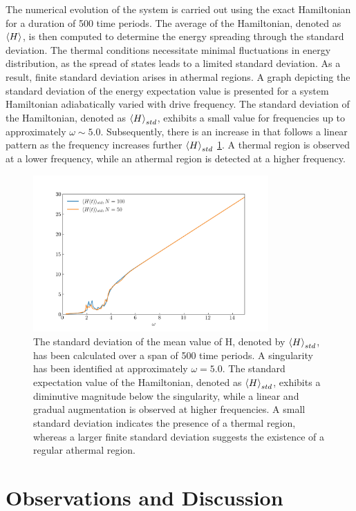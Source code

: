 \documentclass[%
reprint,
superscriptaddress,
amsmath,amssymb,
aps,
prb,
]{revtex4-2}
\begin{document}
	The numerical evolution of the system is carried out using the exact Hamiltonian for a duration of 500 time periods. The average of the Hamiltonian, denoted as $\expval{H}$, is then computed to determine the energy spreading through the standard deviation. The thermal conditions necessitate minimal fluctuations in energy distribution, as the spread of states leads to a limited standard deviation\cite{reimann_symmetry-prohibited_2021}. As a result, finite standard deviation arises in athermal regions. A graph depicting the standard deviation of the energy expectation value is presented for a system Hamiltonian adiabatically varied with drive frequency. The standard deviation of the Hamiltonian, denoted as $\expval{H}_{std}$, exhibits a small value for frequencies up to approximately $\omega \sim 5.0$. Subsequently, there is an increase in  that follows a linear pattern as the frequency increases further $\expval{H}_{std}$ \ref{fig:havg_std}. A thermal region is observed at a lower frequency, while an athermal region is detected at a higher frequency.
	
	\begin{figure}[!ht]
		\centering
		\includegraphics[width = 9.0cm]{hbar_std.jpg}
		\caption{The standard deviation of the mean value of H, denoted by $\expval{H}_{std}$, has been calculated over a span of 500 time periods. A singularity has been identified at approximately $\omega = 5.0$. The standard expectation value of the Hamiltonian, denoted as $\expval{H}_{std}$, exhibits a diminutive magnitude below the singularity, while a linear and gradual augmentation is observed at higher frequencies. A small standard deviation indicates the presence of a thermal region, whereas a larger finite standard deviation suggests the existence of a regular athermal region.}
		\label{fig:havg_std}
	\end{figure}
	
	
	\section{\label{sec:level6}Observations and Discussion}
	
\end{document}

